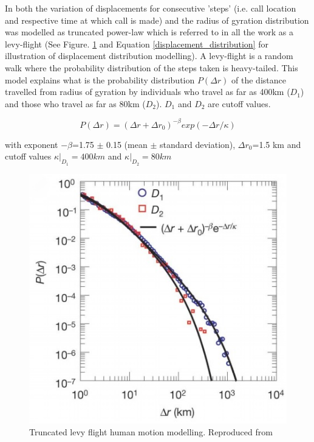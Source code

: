 \documentclass[12pt, a4paper]{report}
\theoremstyle{definition}
\theoremstyle{definition}%
\theoremstyle{definition}%
\theoremstyle{definition}%
\theoremstyle{definition}%
\theoremstyle{definition}%
\begin{document}
In \cite{Gonzalez2008} both the variation of displacements for consecutive 'steps' (i.e. call location and respective time at which call is made) and the radius of gyration distribution was modelled as truncated power-law which is referred to in all the work as a levy-flight (See Figure. \ref{fig:levy_flight} and Equation \ref{displacement_distribution} for illustration of displacement distribution modelling). A levy-flight is a random walk where the probability distribution of the steps taken is heavy-tailed. This model explains what is the probability distribution $P(\Delta r)$  of the distance travelled from radius of gyration by individuals who travel as far as 400km ($D_1$) and those who travel as far as 80km ($D_2$). $D_1$ and $D_2$ are cutoff values. 

\begin{equation}\label{displacement_distribution}
P(\Delta r) = (\Delta r + \Delta r_{0})^{-\beta}  exp(-\Delta r/\kappa)
\end{equation} 

with exponent $-\beta$=1.75 $\pm$ 0.15 (mean $\pm$ standard deviation), $\Delta r_{0}$=1.5 km and cutoff values $\kappa|_{D_{1}}=400 km$ and $\kappa|_{D_{2}}=80 km$ 

\begin{figure}[h]	
	\includegraphics[scale=0.75]{truncated_power_law}
	\centering
	\caption[Truncated Levy Flight]{Truncated levy flight human motion modelling. Reproduced from \cite{Gonzalez2008}}
	\label{fig:levy_flight}
\end{figure}
\end{document}
